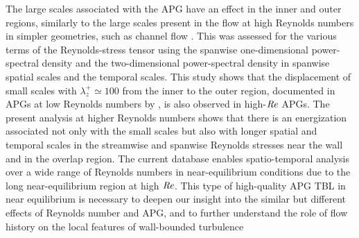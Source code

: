 The large scales associated with the APG have an effect in the inner and outer regions, similarly to the large scales present in the flow at high Reynolds numbers in simpler geometries, such as channel flow \citep{Hoyas_PoF2006}. This was assessed for the various terms of the Reynolds-stress tensor using the spanwise one-dimensional power-spectral density and the two-dimensional power-spectral density in spanwise spatial scales and the temporal scales. 
This study shows that the displacement of small scales with $\lambda_z^+ \simeq 100$ from the inner to the outer region, documented in APGs at low Reynolds numbers by \cite{tanarro_2020, VINUESA2018}, is also observed in high-$\mbox{\textit{Re}}$ APGs.
The present analysis at higher Reynolds numbers shows that there is an energization associated not only with the small scales but also with longer spatial and temporal scales in the streamwise and spanwise Reynolds stresses near the wall and in the overlap region.
The current database enables spatio-temporal analysis over a wide range of Reynolds numbers in near-equilibrium conditions due to the long near-equilibrium region at high $\mbox{\textit{Re}}$. 
This type of high-quality APG TBL in near equilibrium is necessary to deepen our insight into the similar but different effects of Reynolds number and APG, and to further understand the role of flow history on the local features of wall-bounded turbulence 



